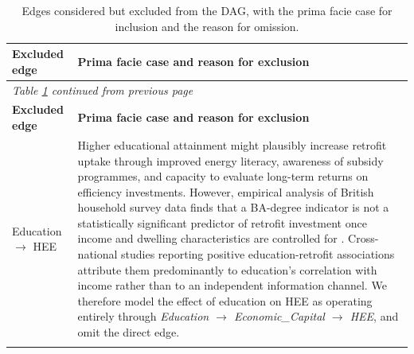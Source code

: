
\begin{longtable}{@{}p{3.8cm}p{11.2cm}@{}}
\caption{Edges considered but excluded from the DAG, with the prima facie case for inclusion and the reason for omission.}
\label{tab:excluded-edges}\\
\toprule
\textbf{Excluded edge} & \textbf{Prima facie case and reason for exclusion} \\
\midrule
\endfirsthead
\multicolumn{2}{l}{\textit{Table \ref{tab:excluded-edges} continued from previous page}}\\
\toprule
\textbf{Excluded edge} & \textbf{Prima facie case and reason for exclusion} \\
\midrule
\endhead
\bottomrule
\endfoot
Education $\to$ HEE & Higher educational attainment might plausibly increase retrofit uptake through improved energy literacy, awareness of subsidy programmes, and capacity to evaluate long-term returns on efficiency investments. However, empirical analysis of British household survey data finds that a BA-degree indicator is not a statistically significant predictor of retrofit investment once income and dwelling characteristics are controlled for \citep{trotta_factors_2018}. Cross-national studies reporting positive education-retrofit associations attribute them predominantly to education's correlation with income rather than to an independent information channel. We therefore model the effect of education on HEE as operating entirely through \textit{Education $\to$ Economic\_Capital $\to$ HEE}, and omit the direct edge. \\
\addlinespace

\end{longtable}
